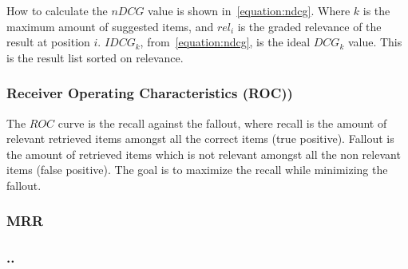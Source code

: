 How to calculate the $nDCG$ value is shown in~\ref{equation:ndcg}.
Where $k$ is the maximum amount of suggested items, and $rel_i$ is the graded relevance of the result at position $i$.
$IDCG_k$, from~\ref{equation:ndcg}, is the ideal $DCG_k$ value.
This is the result list sorted on relevance.



\subsubsection{Receiver Operating Characteristics (ROC))}
The $ROC$ curve is the recall against the fallout, where recall is the amount of relevant retrieved items amongst all the correct items (true positive).
Fallout is the amount of retrieved items which is not relevant amongst all the non relevant items (false positive).
The goal is to maximize the recall while minimizing the fallout.


\subsubsection{MRR}
\subsubsection{..}

